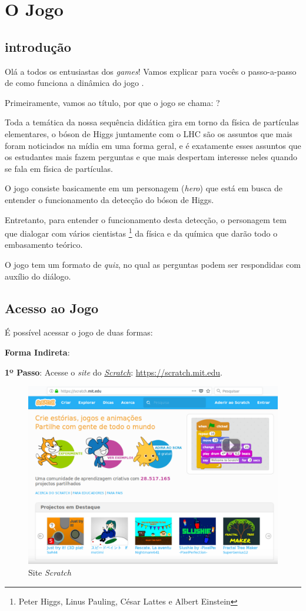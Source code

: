 \documentclass[12pt,fleqn]{book} %
\begin{document}
\chapter{O Jogo }
\section{introdução}

Olá a todos os entusiastas dos \textit{games}! Vamos explicar para vocês o passo-a-passo de como funciona a dinâmica do jogo .

Primeiramente, vamos ao título, por que o jogo se chama: ? 

Toda a temática da nossa sequência didática gira em torno da física de partículas elementares, o bóson de Higgs juntamente com o LHC são os assuntos que mais foram noticiados na mídia em uma forma geral, e é exatamente esses assuntos que os estudantes mais fazem perguntas e que mais despertam interesse neles quando se fala em física de partículas.

O jogo consiste basicamente em um personagem (\textit{hero}) que está em busca de entender o funcionamento da detecção do bóson de Higgs.

Entretanto, para entender o funcionamento desta detecção, o personagem tem que dialogar com vários cientistas \footnote{Peter Higgs, Linus Pauling, César Lattes e Albert Einstein} da física e da química que darão todo o embasamento teórico.

O jogo tem um formato de \textit{quiz}, no qual as perguntas podem ser respondidas com auxílio do diálogo.

\section{Acesso ao Jogo}

É possível acessar o jogo de duas formas: 

\textbf{Forma Indireta}:

\textbf{1º Passo}: Acesse o \textit{site} do \href{https://scratch.mit.edu}{\textit{Scratch}}: \url{https://scratch.mit.edu}.

\begin{figure}[ht]
	\centering
	\includegraphics[width=0.7 \textwidth]{Produto/site_scratch}
	\caption{Site \textit{Scratch}}
	\label{fig:app_a:sitescratch}
\end{figure}
\end{document}
